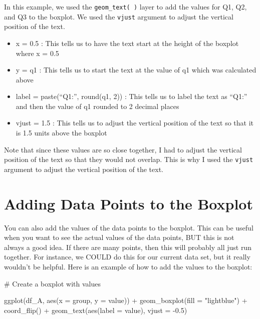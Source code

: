 \documentclass[
  letterpaper,
  DIV=11,
  numbers=noendperiod]{scrreprt}
\newenvironment{Shaded}{\begin{snugshade}}{\end{snugshade}}
\newcommand{\AttributeTok}[1]{\textcolor[rgb]{0.40,0.45,0.13}{#1}}
\newcommand{\CommentTok}[1]{\textcolor[rgb]{0.37,0.37,0.37}{#1}}
\newcommand{\FloatTok}[1]{\textcolor[rgb]{0.68,0.00,0.00}{#1}}
\newcommand{\FunctionTok}[1]{\textcolor[rgb]{0.28,0.35,0.67}{#1}}
\newcommand{\NormalTok}[1]{\textcolor[rgb]{0.00,0.23,0.31}{#1}}
\newcommand{\SpecialCharTok}[1]{\textcolor[rgb]{0.37,0.37,0.37}{#1}}
\newcommand{\StringTok}[1]{\textcolor[rgb]{0.13,0.47,0.30}{#1}}
\providecommand{\tightlist}{%
  \setlength{\itemsep}{0pt}\setlength{\parskip}{0pt}}\usepackage{longtable,booktabs,array}
\begin{document}
In this example, we used the \texttt{geom\_text(\ )} layer to add the
values for Q1, Q2, and Q3 to the boxplot. We used the \texttt{vjust}
argument to adjust the vertical position of the text.

\begin{itemize}
\tightlist
\item
  x = 0.5 : This tells us to have the text start at the height of the
  boxplot where x = 0.5
\item
  y = q1 : This tells us to start the text at the value of q1 which was
  calculated above
\item
  label = paste(``Q1:'', round(q1, 2)) : This tells us to label the text
  as ``Q1:'' and then the value of q1 rounded to 2 decimal places
\item
  vjust = 1.5 : This tells us to adjust the vertical position of the
  text so that it is 1.5 units above the boxplot
\end{itemize}

Note that since these values are so close together, I had to adjust the
vertical position of the text so that they would not overlap. This is
why I used the \texttt{vjust} argument to adjust the vertical position
of the text.

\section*{Adding Data Points to the
Boxplot}\label{adding-data-points-to-the-boxplot}


You can also add the values of the data points to the boxplot. This can
be useful when you want to see the actual values of the data points, BUT
this is not always a good idea. If there are many points, then this will
probably all just run together. For instance, we COULD do this for our
current data set, but it really wouldn't be helpful. Here is an example
of how to add the values to the boxplot:

\begin{Shaded}
\begin{Highlighting}[]
\CommentTok{\# Create a boxplot with values}

\FunctionTok{ggplot}\NormalTok{(df\_A, }\FunctionTok{aes}\NormalTok{(}\AttributeTok{x =}\NormalTok{ group, }\AttributeTok{y =}\NormalTok{ value)) }\SpecialCharTok{+}
  \FunctionTok{geom\_boxplot}\NormalTok{(}\AttributeTok{fill =} \StringTok{"lightblue"}\NormalTok{) }\SpecialCharTok{+}
  \FunctionTok{coord\_flip}\NormalTok{() }\SpecialCharTok{+}
  \FunctionTok{geom\_text}\NormalTok{(}\FunctionTok{aes}\NormalTok{(}\AttributeTok{label =}\NormalTok{ value), }\AttributeTok{vjust =} \SpecialCharTok{{-}}\FloatTok{0.5}\NormalTok{)}
\end{Highlighting}
\end{Shaded}
\end{document}
